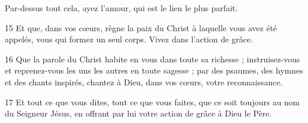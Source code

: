 Par-dessus tout cela, ayez l’amour, qui est le lien le plus parfait.

15 Et que, dans vos cœurs, règne la paix du Christ à laquelle vous avez été appelés, vous qui formez un seul corps. Vivez dans l’action de grâce.

16 Que la parole du Christ habite en vous dans toute sa richesse ; instruisez-vous et reprenez-vous les uns les autres en toute sagesse ; par des psaumes, des hymnes et des chants inspirés, chantez à Dieu, dans vos cœurs, votre reconnaissance.

17 Et tout ce que vous dites, tout ce que vous faites, que ce soit toujours au nom du Seigneur Jésus, en offrant par lui votre action de grâce à Dieu le Père.
